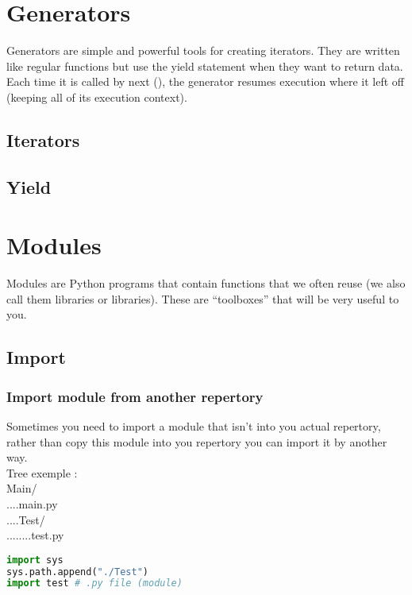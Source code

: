 \documentclass[a4paper, 12pt, titlepage]{scrartcl} %
\begin{document}
\newpage
\section{Generators}
\label{sec:Generators}
Generators are simple and powerful tools for creating iterators. They are written like regular functions but use the yield statement when they want to return data. Each time it is called by next (), the generator resumes execution where it left off (keeping all of its execution context).\newline
\subsection{Iterators}
\subsection{Yield}

\newpage
\section{Modules}
Modules are Python programs that contain functions that we often reuse (we also call them libraries or libraries). These are “toolboxes” that will be very useful to you.\newline

\subsection{Import}
\label{subsec:Import}
\subsubsection{Import module from another repertory}
Sometimes you need to import a module that isn't into you actual repertory, rather than copy this module into you repertory you can import it by another way. \\

Tree exemple : \\
Main/ \\
....main.py \\
....Test/ \\
........test.py \\

\begin{lstlisting}[language=Python]
import sys
sys.path.append("./Test")
import test # .py file (module)
\end{lstlisting}
\end{document}
